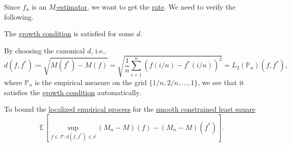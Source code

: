 Since \(\hat{f} _n \) is an \hyperref[prb:M-estimation]{\(M\)-estimator}, we want to get the \hyperref[def:rate-of-convergence]{rate}. We need to verify the following.

\begin{claim}
	The \hyperref[def:growth-condition*]{growth condition} is satisfied for some \(d\).
\end{claim}
\begin{explanation}
	By choosing the canonical \(d\), i.e.,
	\[
		d(f, f^{\ast} )
		\coloneqq \sqrt{M(f^{\ast} ) - M(f)}
		= \sqrt{\frac{1}{n} \sum_{i=1}^{n} \left( f (i / n) - f^{\ast} (i / n)  \right) ^2}
		= L_2(\mathbb{P} _n) (f, f^{\ast} ),
	\]
	where \(\mathbb{P} _n\) is the empirical measure on the grid \(\{ 1 / n, 2 / n, \dots , 1 \} \), we see that it satisfies the \hyperref[def:growth-condition*]{growth condition} automatically.
\end{explanation}

To bound the \hyperref[def:localized-EP]{localized empirical process} for the \hyperref[prb:smooth-LS]{smooth constrained least square}
\[
	\mathbb{E}_{}\left[\sup _{f\in \mathscr{F} \colon d(f, f^{\ast} ) \leq \delta } (M_n - M)(f) - (M_n - M)(f^{\ast} ) \right].
\]

